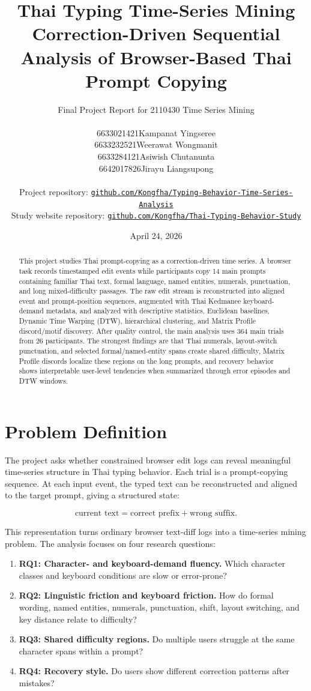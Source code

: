 \documentclass[11pt,a4paper]{article}
\title{\vspace{-1.5em}\textbf{Thai Typing Time-Series Mining}\\
\large Correction-Driven Sequential Analysis of Browser-Based Thai Prompt Copying}
\author{
Final Project Report for 2110430 Time Series Mining\\[0.8em]
\begin{tabular}{ll}
6633021421 & Kampanat Yingseree\\
6633232521 & Weerawat Wongmanit\\
6633284121 & Asiwish Chutanunta\\
6642017826 & Jirayu Liangsupong
\end{tabular}\\[0.8em]
\small
Project repository: \href{https://github.com/Kongfha/Typing-Behavior-Time-Series-Analysis}{\texttt{github.com/Kongfha/Typing-Behavior-Time-Series-Analysis}}\\
Study website repository: \href{https://github.com/Kongfha/Thai-Typing-Behavior-Study}{\texttt{github.com/Kongfha/Thai-Typing-Behavior-Study}}
}
\date{April 24, 2026}
\begin{document}
\maketitle

\begin{abstract}
This project studies Thai prompt-copying as a correction-driven time series. A browser task records timestamped edit events while participants copy 14 main prompts containing familiar Thai text, formal language, named entities, numerals, punctuation, and long mixed-difficulty passages. The raw edit stream is reconstructed into aligned event and prompt-position sequences, augmented with Thai Kedmanee keyboard-demand metadata, and analyzed with descriptive statistics, Euclidean baselines, Dynamic Time Warping (DTW), hierarchical clustering, and Matrix Profile discord/motif discovery. After quality control, the main analysis uses 364 main trials from 26 participants. The strongest findings are that Thai numerals, layout-switch punctuation, and selected formal/named-entity spans create shared difficulty, Matrix Profile discords localize these regions on the long prompts, and recovery behavior shows interpretable user-level tendencies when summarized through error episodes and DTW windows.
\end{abstract}

\clearpage
\tableofcontents
\clearpage

\section{Problem Definition}

The project asks whether constrained browser edit logs can reveal meaningful time-series structure in Thai typing behavior. Each trial is a prompt-copying sequence. At each input event, the typed text can be reconstructed and aligned to the target prompt, giving a structured state:

\[
\text{current text} = \text{correct prefix} + \text{wrong suffix}.
\]

This representation turns ordinary browser text-diff logs into a time-series mining problem. The analysis focuses on four research questions:

\begin{enumerate}
  \item \textbf{RQ1: Character- and keyboard-demand fluency.} Which character classes and keyboard conditions are slow or error-prone?
  \item \textbf{RQ2: Linguistic friction and keyboard friction.} How do formal wording, named entities, numerals, punctuation, shift, layout switching, and key distance relate to difficulty?
  \item \textbf{RQ3: Shared difficulty regions.} Do multiple users struggle at the same character spans within a prompt?
  \item \textbf{RQ4: Recovery style.} Do users show different correction patterns after mistakes?
\end{enumerate}
\end{document}
